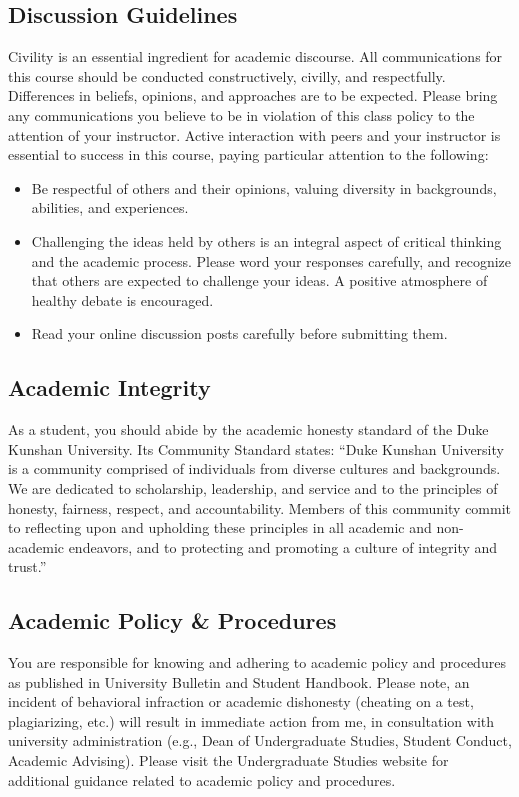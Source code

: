 \documentclass[11pt]{article}
\begin{document}
\subsection{Discussion Guidelines}

Civility is an essential ingredient for academic discourse. All communications for this course should be conducted constructively, civilly, and respectfully. Differences in beliefs, opinions, and approaches are to be expected. Please bring any communications you believe to be in violation of this class policy to the attention of your instructor. Active interaction with peers and your instructor is essential to success in this course, paying particular attention to the following: 
\begin{itemize}[label={-},noitemsep]
\item Be respectful of others and their opinions, valuing diversity in backgrounds, abilities, and experiences.  
\item Challenging the ideas held by others is an integral aspect of critical thinking and the academic process. Please word your responses carefully, and recognize that others are expected to challenge your ideas. A positive atmosphere of healthy debate is encouraged.  
\item Read your online discussion posts carefully before submitting them. 
\end{itemize}

\subsection{Academic Integrity}

As a student, you should abide by the academic honesty standard of the Duke Kunshan University. Its Community Standard states: “Duke Kunshan University is a community comprised of individuals from diverse cultures and backgrounds.  We are dedicated to scholarship, leadership, and service and to the principles of honesty, fairness, respect, and accountability. Members of this community commit to reflecting upon and upholding these principles in all academic and non-academic endeavors, and to protecting and promoting a culture of integrity and trust.”

\subsection{Academic Policy \& Procedures}

You are responsible for knowing and adhering to academic policy and procedures as published in University Bulletin and Student Handbook. Please note, an incident of behavioral infraction or academic dishonesty (cheating on a test, plagiarizing, etc.) will result in immediate action from me, in consultation with university administration (e.g., Dean of Undergraduate Studies, Student Conduct, Academic Advising).  Please visit the Undergraduate Studies website for additional guidance related to academic policy and procedures.
\end{document}
